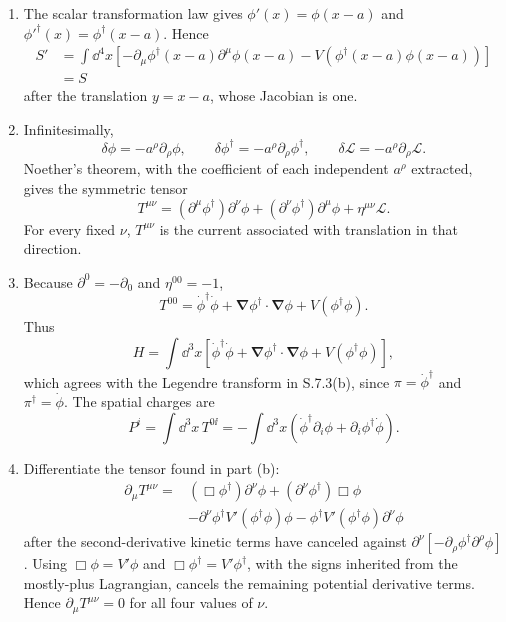 \begin{enumerate}
\begin{enumerate}
\item
The scalar transformation law gives
\(\phi'(x)=\phi(x-a)\) and
\(\phi'^\dagger(x)=\phi^\dagger(x-a)\).  Hence
\[
\begin{split}
 S'&=\int \dd^4x\left[
 -\partial_\mu\phi^\dagger(x-a)\partial^\mu\phi(x-a)
 -V\!\left(\phi^\dagger(x-a)\phi(x-a)\right)\right]\\
 &=S
\end{split}
\]
after the translation \(y=x-a\), whose Jacobian is one.
\item
Infinitesimally,
\[
 \delta\phi=-a^\rho\partial_\rho\phi,\qquad
 \delta\phi^\dagger=-a^\rho\partial_\rho\phi^\dagger,\qquad
 \delta\mathcal L=-a^\rho\partial_\rho\mathcal L.
\]
Noether's theorem, with the coefficient of each independent
\(a^\rho\) extracted, gives the symmetric tensor
\[
 T^{\mu\nu}
 =(\partial^\mu\phi^\dagger)\partial^\nu\phi
 +(\partial^\nu\phi^\dagger)\partial^\mu\phi
 +\eta^{\mu\nu}\mathcal L .
\]
For every fixed \(\nu\), \(T^{\mu\nu}\) is the current associated with
translation in that direction.
\item
Because \(\partial^0=-\partial_0\) and \(\eta^{00}=-1\),
\[
 T^{00}
 =\dot\phi^\dagger\dot\phi
  +\boldsymbol\nabla\phi^\dagger\cdot\boldsymbol\nabla\phi
  +V(\phi^\dagger\phi).
\]
Thus
\[
 H=\int \dd^3x\left[
 \dot\phi^\dagger\dot\phi
 +\boldsymbol\nabla\phi^\dagger\cdot\boldsymbol\nabla\phi
 +V(\phi^\dagger\phi)\right],
\]
which agrees with the Legendre transform in S.7.3(b), since
\(\pi=\dot\phi^\dagger\) and
\(\pi^\dagger=\dot\phi\).  The spatial charges are
\[
 P^i=\int \dd^3x\,T^{0\ii}
 =-\int \dd^3x\left(
 \dot\phi^\dagger\partial_i\phi
 +\partial_i\phi^\dagger\dot\phi\right).
\]
\item
Differentiate the tensor found in part (b):
\[
 \begin{split}
 \partial_\mu T^{\mu\nu}
 ={}&(\Box\phi^\dagger)\partial^\nu\phi
 +(\partial^\nu\phi^\dagger)\Box\phi\\
 &-\partial^\nu\phi^\dagger
   V'(\phi^\dagger\phi)\phi
 -\phi^\dagger V'(\phi^\dagger\phi)\partial^\nu\phi
 \end{split}
\]
after the second-derivative kinetic terms have canceled against
\(\partial^\nu[-\partial_\rho\phi^\dagger\partial^\rho\phi]\).
Using
\(\Box\phi=V'\phi\) and
\(\Box\phi^\dagger=V'\phi^\dagger\), with the signs inherited from the
mostly-plus Lagrangian, cancels the remaining potential derivative
terms.  Hence \(\partial_\mu T^{\mu\nu}=0\) for all four values of
\(\nu\).
\end{enumerate}


\end{enumerate}
